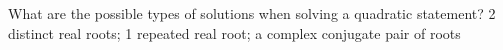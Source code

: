 {What are the possible types of solutions when solving a quadratic statement?}
{2 distinct real roots; 1 repeated real root; a complex conjugate pair of roots}
